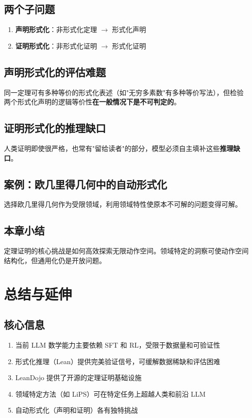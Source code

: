 \documentclass[a4paper]{article}
\begin{document}
\subsection{两个子问题}

\begin{enumerate}
    \item \textbf{声明形式化}：非形式化定理 $\to$ 形式化声明
    \item \textbf{证明形式化}：非形式化证明 $\to$ 形式化证明
\end{enumerate}

\subsection{声明形式化的评估难题}

同一定理可有多种等价的形式化表述（如"无穷多素数"有多种等价写法），但检验两个形式化声明的逻辑等价性\textbf{在一般情况下是不可判定的}。

\subsection{证明形式化的推理缺口}

人类证明即使很严格，也常有"留给读者"的部分，模型必须自主填补这些\textbf{推理缺口}。

\subsection{案例：欧几里得几何中的自动形式化}

选择欧几里得几何作为受限领域，利用领域特性使原本不可解的问题变得可解。

\subsection{本章小结}

定理证明的核心挑战是如何高效探索无限动作空间。领域特定的洞察可使动作空间结构化，但通用化仍是开放问题。

\section{总结与延伸}

\subsection{核心信息}

\begin{enumerate}
    \item 当前 LLM 数学能力主要依赖 SFT 和 RL，受限于数据量和可验证性
    \item 形式化推理（Lean）提供完美验证信号，可缓解数据稀缺和评估困难
    \item LeanDojo 提供了开源的定理证明基础设施
    \item 领域特定方法（如 LiPS）可在特定任务上超越人类和前沿 LLM
    \item 自动形式化（声明和证明）各有独特挑战
\end{enumerate}
\end{document}
